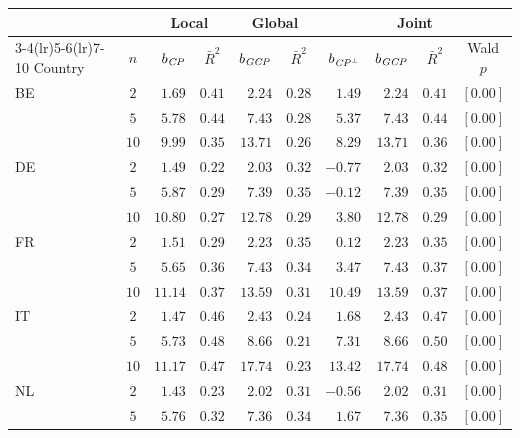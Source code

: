 \footnotesize
\setlength{\tabcolsep}{4pt}
\begin{tabular}{l c rc rc rrcc}
  \toprule
  & & \multicolumn{2}{c}{Local} & \multicolumn{2}{c}{Global}
    & \multicolumn{4}{c}{Joint} \\
  \cmidrule(lr){3-4}\cmidrule(lr){5-6}\cmidrule(lr){7-10}
  Country & $n$ & $b_{\mathit{CP}}$ & $\bar{R}^{2}$ & $b_{\mathit{GCP}}$ & $\bar{R}^{2}$
          & $b_{\mathit{CP}^{\perp}}$ & $b_{\mathit{GCP}}$ & $\bar{R}^{2}$ & Wald $p$ \\
  \midrule
  BE & $2$  & $1.69$  & $0.41$ & $2.24$  & $0.28$ & $1.49$  & $2.24$  & $0.41$ & $[0.00]$ \\
     & $5$  & $5.78$  & $0.44$ & $7.43$  & $0.28$ & $5.37$  & $7.43$  & $0.44$ & $[0.00]$ \\
     & $10$ & $9.99$  & $0.35$ & $13.71$ & $0.26$ & $8.29$  & $13.71$ & $0.36$ & $[0.00]$ \\
  \addlinespace
  DE & $2$  & $1.49$  & $0.22$ & $2.03$  & $0.32$ & $-0.77$ & $2.03$  & $0.32$ & $[0.00]$ \\
     & $5$  & $5.87$  & $0.29$ & $7.39$  & $0.35$ & $-0.12$ & $7.39$  & $0.35$ & $[0.00]$ \\
     & $10$ & $10.80$ & $0.27$ & $12.78$ & $0.29$ & $3.80$  & $12.78$ & $0.29$ & $[0.00]$ \\
  \addlinespace
  FR & $2$  & $1.51$  & $0.29$ & $2.23$  & $0.35$ & $0.12$  & $2.23$  & $0.35$ & $[0.00]$ \\
     & $5$  & $5.65$  & $0.36$ & $7.43$  & $0.34$ & $3.47$  & $7.43$  & $0.37$ & $[0.00]$ \\
     & $10$ & $11.14$ & $0.37$ & $13.59$ & $0.31$ & $10.49$ & $13.59$ & $0.37$ & $[0.00]$ \\
  \addlinespace
  IT & $2$  & $1.47$  & $0.46$ & $2.43$  & $0.24$ & $1.68$  & $2.43$  & $0.47$ & $[0.00]$ \\
     & $5$  & $5.73$  & $0.48$ & $8.66$  & $0.21$ & $7.31$  & $8.66$  & $0.50$ & $[0.00]$ \\
     & $10$ & $11.17$ & $0.47$ & $17.74$ & $0.23$ & $13.42$ & $17.74$ & $0.48$ & $[0.00]$ \\
  \addlinespace
  NL & $2$  & $1.43$  & $0.23$ & $2.02$  & $0.31$ & $-0.56$ & $2.02$  & $0.31$ & $[0.00]$ \\
     & $5$  & $5.76$  & $0.32$ & $7.36$  & $0.34$ & $1.67$  & $7.36$  & $0.35$ & $[0.00]$ \\

\end{tabular}
